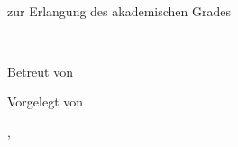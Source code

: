 \begin{titlepage}

\begin{center}

\vspace*{30mm}

{\LARGE\bfseries\mytitle{}}

\vspace{5mm}

{\bfseries\myworktitle{}}

\end{center}

\vfill

\begin{flushright}

\vspace*{15mm}

\mykindofthesis{}\\
zur Erlangung des akademischen Grades\\
\vspace*{2mm}
\mygainacademicdegree{}

\vspace{20mm}

\myuniversity{}\\
\mydepartment{}

\vspace*{10mm}

Betreut von\\
\mysupervisor{}

\vspace*{10mm}

Vorgelegt von\\
\myauthor{}

\vfill

\mysubmissiontown{}, \mysubmissionyear{}

\end{flushright}

\end{titlepage}